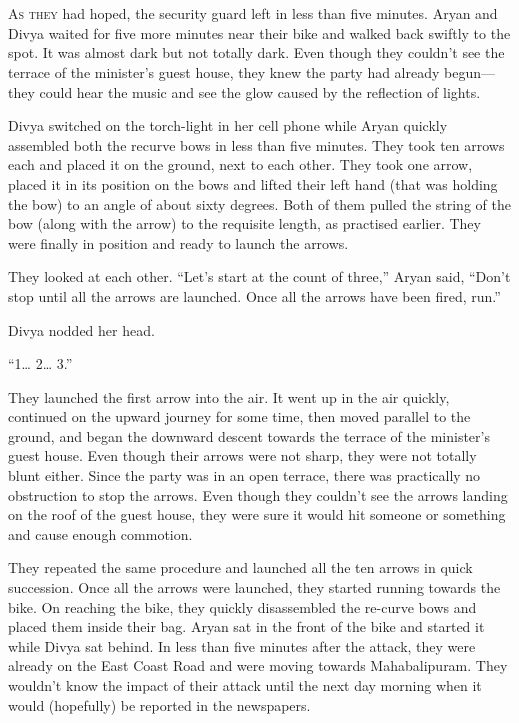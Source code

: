 \chapter{}

\lettrine{A}{s they} had hoped, the security guard left in less than five minutes. Aryan and
Divya waited for five more minutes near their bike and walked back swiftly to
the spot. It was almost dark but not totally dark. Even though they couldn't see
the terrace of the minister's guest house, they knew the party had already
begun—they could hear the music and see the glow caused by the reflection of
lights.


Divya switched on the torch-light in her cell phone while Aryan quickly
assembled both the recurve bows in less than five minutes. They took ten arrows
each and placed it on the ground, next to each other. They took one arrow,
placed it in its position on the bows and lifted their left hand (that was
holding the bow) to an angle of about sixty degrees. Both of them pulled the
string of the bow (along with the arrow) to the requisite length, as practised
earlier. They were finally in position and ready to launch the arrows.

They looked at each other. “Let's start at the count of three,” Aryan said,
“Don't stop until all the arrows are launched. Once all the arrows have been
fired, run.”

Divya nodded her head.

“1… 2… 3.”

They launched the first arrow into the air. It went up in the air quickly,
continued on the upward journey for some time, then moved parallel to the ground,
and began the downward descent towards the terrace of the minister's guest
house. Even though their arrows were not sharp, they were not totally blunt
either. Since the party was in an open terrace, there was practically no
obstruction to stop the arrows. Even though they couldn't see the arrows landing
on the roof of the guest house, they were sure it would hit someone or something
and cause enough commotion.

They repeated the same procedure and launched all the ten arrows in quick
succession. Once all the arrows were launched, they started running towards the
bike. On reaching the bike, they quickly disassembled the re-curve bows and
placed them inside their bag. Aryan sat in the front of the bike and started it
while Divya sat behind. In less than five minutes after the attack, they were
already on the East Coast Road and were moving towards Mahabalipuram. They
wouldn't know the impact of their attack until the next day morning when it
would (hopefully) be reported in the newspapers.


